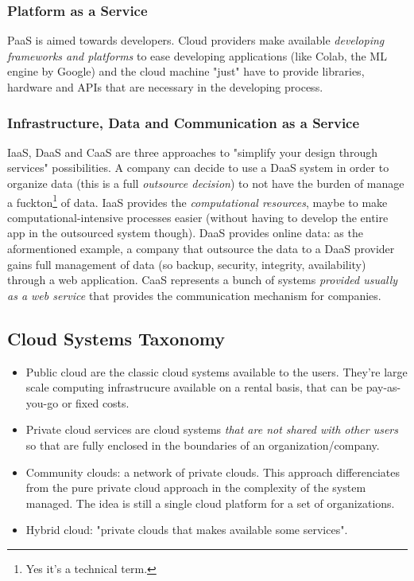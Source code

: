 \documentclass[10pt,a4paper]{article}
\begin{document}
				\subsubsection{Platform as a Service}
					PaaS is aimed towards developers. Cloud providers make available \emph{developing frameworks and platforms} to ease developing applications (like Colab, the ML engine by Google) and the cloud machine "just" have to provide libraries, hardware and APIs that are necessary in the developing process.
				
				\subsubsection{Infrastructure, Data and Communication as a Service}
					IaaS, DaaS and CaaS are three approaches to "simplify your design through services" possibilities. A company can decide to use a DaaS system in order to organize data (this is a full \emph{outsource decision}) to not have the burden of manage a fuckton\footnote{Yes it's a technical term.} of data. IaaS provides the \emph{computational resources}, maybe to make computational-intensive processes easier (without having to develop the entire app in the outsourced system though). DaaS provides online data: as the aformentioned example, a company that outsource the data to a DaaS provider gains full management of data (so backup, security, integrity, availability) through a web application. CaaS represents a bunch of systems \emph{provided usually as a web service} that provides the communication mechanism for companies. 
				
			\subsection{Cloud Systems Taxonomy}
				\begin{itemize}
					\item Public cloud are the classic cloud systems available to the users. They're large scale computing infrastrucure available on a rental basis, that can be pay-as-you-go or fixed costs.
					\item Private cloud services are cloud systems \emph{that are not shared with other users} so that are fully enclosed in the boundaries of an organization/company.
					\item Community clouds: a network of private clouds. This approach differenciates from the pure private cloud approach in the complexity of the system managed. The idea is still a single cloud platform for a set of organizations.
					\item Hybrid cloud: "private clouds that makes available some services".
				\end{itemize}
				
\end{document}
